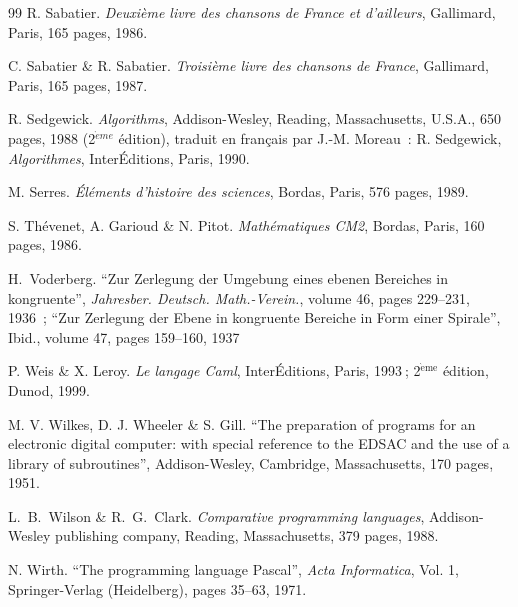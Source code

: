 \begin{thebibliography}{99}
 R. Sabatier.
{\em Deuxième livre des chansons de France et d'ailleurs}, 
Gallimard, Paris, 165 pages, 1986.

 C. Sabatier \& R. Sabatier.
{\em Troisième livre des chansons de France}, 
Gallimard, Paris, 165 pages, 1987.

 R. Sedgewick.
{\em Algorithms}, Addison-Wesley, Reading, Massachusetts, U.S.A., 
650 pages, 1988 (2$^{\grave{e}me}$ édition), {\footnotesize traduit en français par
J.-M. Moreau~:} R. Sedgewick, {\em Algorithmes}, InterÉditions, Paris, 1990.

 M. Serres.
{\em Éléments d'histoire des sciences},  Bordas, Paris, 576 pages, 1989.

 S. Thévenet, A. Garioud \& N. Pitot.
{\em Mathématiques CM2},  Bordas, Paris, 160 pages, 1986.

 H.~Voderberg.
``Zur Zerlegung der Umgebung eines ebenen Bereiches in kongruente'', 
{\em Jahresber. Deutsch. Math.-Verein.}, 
volume 46, pages 229--231, 1936~;
``Zur Zerlegung der Ebene in kongruente Bereiche in Form einer Spirale'', 
{Ibid.}, 
volume 47, pages 159--160, 1937


 P. Weis \& X. Leroy.
{\em Le langage Caml}, InterÉditions, Paris, 1993$\:$; 2$^{\mathrm{\grave{e}me}}$ édition, Dunod, 1999.

 M. V. Wilkes, D. J. Wheeler \& S. Gill. 
``The preparation of programs for an electronic digital computer: with special reference to 
the EDSAC and the use of a library of subroutines'', Addison-Wesley, Cambridge, 
Massachusetts, 170 pages, 1951.

 L.~B.~Wilson \& R.~G.~Clark.
{\em Comparative programming languages},  Addison-Wesley publishing company,
 Reading, Massachusetts, 379 pages, 1988.

 N. Wirth.
``The programming language Pascal'', {\em Acta Informatica}, Vol. 1, Springer-Verlag (Heidelberg), 
pages 35--63, 1971.

\end{thebibliography}

